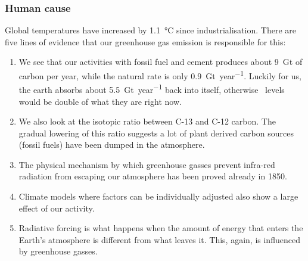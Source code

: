 \documentclass[../summary.tex]{subfiles}
\begin{document}
\newpage
\subsubsection{Human cause}
Global temperatures have increased by \SI{1.1}{\degreeCelsius} since industrialisation. There are five lines of evidence that our greenhouse gas emission is responsible for this:
\begin{enumerate}
	\item We see that our activities with fossil fuel and cement produces about \SI{9}{\giga\tonne} of carbon per year, while the natural rate is only \SI{0.9}{\giga\tonne\per year}. Luckily for us, the earth absorbs about \SI{5.5}{\giga\tonne\per year} back into itself, otherwise \COtwo\ levels would be double of what they are right now.
	\item We also look at the isotopic ratio between C-13 and C-12 carbon. The gradual lowering of this ratio suggests a lot of plant derived carbon sources (fossil fuels) have been dumped in the atmosphere.
	\item The physical mechanism by which greenhouse gasses prevent infra-red radiation from escaping our atmosphere has been proved already in 1850.
	\item Climate models where factors can be individually adjusted also show a large effect of our activity.
	\item Radiative forcing is what happens when the amount of energy that enters the Earth's atmosphere is different from what leaves it. This, again, is influenced by greenhouse gasses.
\end{enumerate}
\end{document}
